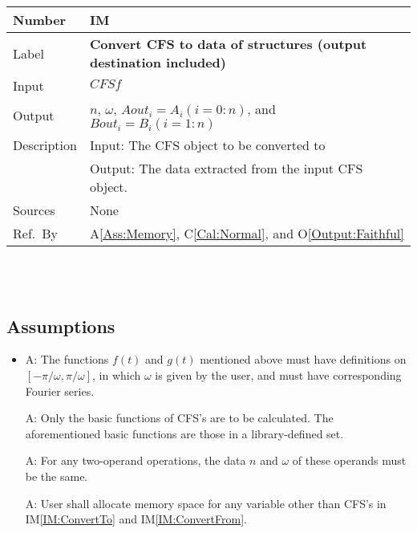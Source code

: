 \documentclass[12pt]{article}
\newcommand{\colAwidth}{0.13\textwidth}
\newcommand{\colBwidth}{0.82\textwidth}
\newcounter{assumpnum} %
\newcommand{\aref}[1]{A\ref{#1}}
\newcommand{\calref}[1]{C\ref{#1}}
\newcommand{\oref}[1]{O\ref{#1}}
\newcounter{instnum} %
\newcommand{\iref}[1]{IM\ref{#1}}
\begin{document}
\noindent
\begin{minipage}{\textwidth}
	\renewcommand*{\arraystretch}{1.5}
	\begin{tabular}{| p{\colAwidth} | p{\colBwidth}|}
		\hline
		\rowcolor[gray]{0.9}
		Number& IM{instnum}\theinstnum 
		\label{IM:ConvertFrom}\\
		\hline
		Label& \bf Convert CFS to data of structures 
		(output destination included) \\
		\hline
		Input& $\mathit{CFSf}$\\
		\hline
		Output& $n$, $\omega$, $\mathit{Aout}_{i}=A_i (i=0:n)$, 
		and $\mathit{Bout}_{i}=B_i (i=1:n)$\\
		\hline
		Description&Input: The CFS object to be converted to\\
		&Output: The data extracted from the input CFS object.\\
		\hline
		Sources&None\\
		\hline
		Ref.\ By &   \aref{Ass:Memory}, \calref{Cal:Normal}, 
		and \oref{Output:Faithful}\\
		\hline
	\end{tabular}
\end{minipage}\\
~\newline

\subsection{Assumptions}
\newcommand{\aitem}[1]{\item[A\refstepcounter{assumpnum}\theassumpnum \label{Ass:#1}:] }
\begin{itemize}

\aitem{FunctionProperty}
The functions $f(t)$ and $g(t)$ mentioned above must have definitions on 
$[-\pi/\omega, \pi/\omega]$, in which $\omega$ is given by the user, 
and must have corresponding Fourier series.
\item[A\refstepcounter{assumpnum}\theassumpnum \label{Ass:BasicFunction}:] 
Only the basic functions of CFS's are to be calculated. The aforementioned 
basic functions are those in a library-defined set.
\item[A\refstepcounter{assumpnum}\theassumpnum \label{Ass:CFSPropertyMatch}:] 
For any two-operand operations, the data $n$ and $\omega$ of these operands 
must be the same. 
\item[A\refstepcounter{assumpnum}\theassumpnum \label{Ass:Memory}:] 
User shall allocate memory space for any variable other than 
CFS's in \iref{IM:ConvertTo} and \iref{IM:ConvertFrom}.
\end{itemize}
\end{document}
